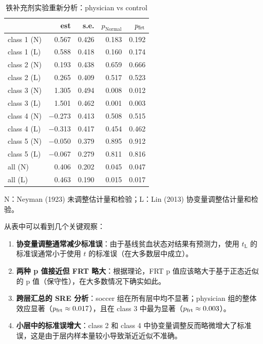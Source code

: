 \begin{table}[htbp]
\caption{铁补充剂实验重新分析：physician vs control}
\label{tab:8-iron-physician}
\centering
\begin{tabular}{lrrrr}
\toprule
 & est & s.e. & $p_\text{Normal}$ & $p_{\text{frt}}$ \\
\midrule
class 1 (N) & 0.567 & 0.426 & 0.183 & 0.192 \\
class 1 (L) & 0.588 & 0.418 & 0.160 & 0.174 \\
class 2 (N) & 0.193 & 0.438 & 0.659 & 0.666 \\
class 2 (L) & 0.265 & 0.409 & 0.517 & 0.523 \\
class 3 (N) & 1.305 & 0.494 & 0.008 & 0.012 \\
class 3 (L) & 1.501 & 0.462 & 0.001 & 0.003 \\
class 4 (N) & $-$0.273 & 0.413 & 0.508 & 0.515 \\
class 4 (L) & $-$0.313 & 0.417 & 0.454 & 0.462 \\
class 5 (N) & $-$0.050 & 0.379 & 0.895 & 0.912 \\
class 5 (L) & $-$0.067 & 0.279 & 0.811 & 0.816 \\
\midrule
all (N) & 0.406 & 0.202 & 0.045 & 0.047 \\
all (L) & 0.463 & 0.190 & 0.015 & 0.017 \\
\bottomrule
\end{tabular}
\par\medskip\small
N：Neyman (1923) 未调整估计量和检验；L：Lin (2013) 协变量调整估计量和检验。
\end{table}

从表中可以看到几个关键观察：

\begin{enumerate}
  \item \textbf{协变量调整通常减少标准误}：由于基线贫血状态对结果有预测力，使用 $t_\mathrm{L}$ 的标准误通常小于使用 $t$ 的标准误（在大多数层中成立）。
  \item \textbf{两种 p 值接近但 FRT 略大}：根据理论，FRT p 值应该略大于基于正态近似的 p 值（保守性），在大多数情况下确实如此。
  \item \textbf{跨层汇总的 SRE 分析}：soccer 组在所有层中均不显著；physician 组的整体效应显著（$p_{\text{frt}} \approx 0.017$），且在 class 3 中最为显著（$p_{\text{frt}} \approx 0.003$）。
  \item \textbf{小层中的标准误增大}：class 2 和 class 4 中协变量调整反而略微增大了标准误，这是由于层内样本量较小导致渐近近似不准确。
\end{enumerate}

